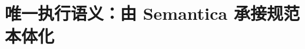 \documentclass[12pt]{ctexbook}
\begin{document}











\part{\texorpdfstring{唯一执行语义：由 Semantica 承接规范本体化}{唯一执行语义：由 Semantica 承接规范本体化}}












\appendix





\fi
\end{document}

